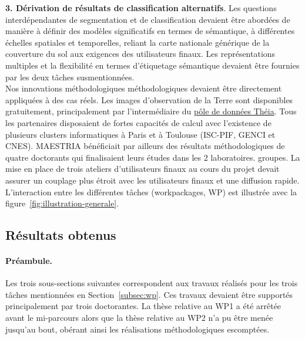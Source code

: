 \textbf{3. Dérivation de résultats de classification alternatifs}. Les questions interdépendantes de segmentation et de classification devaient être abordées de manière à définir des modèles significatifs en termes de sémantique, à différentes échelles spatiales et temporelles, reliant la carte nationale générique de la couverture du sol aux exigences des utilisateurs finaux. Les représentations multiples et la flexibilité en termes d'étiquetage sémantique devaient être fournies par les deux tâches susmentionnées.\\

Nos innovations méthodologiques méthodologiques devaient être directement appliquées à des cas réels. Les images d'observation de la Terre sont disponibles gratuitement, principalement par l'intermédiaire du \href{https://www.theia-land.fr/pole-theia-2/}{pôle de données Théia}. Tous les partenaires disposaient de fortes capacités
de calcul avec l'existence de plusieurs clusters informatiques à Paris et à Toulouse (ISC-PIF, GENCI et CNES). MAESTRIA bénéficiait par ailleurs des résultats méthodologiques de quatre doctorants qui finalisaient leurs études dans les 2 laboratoires. groupes. La mise en place de trois ateliers d'utilisateurs finaux au cours du projet devait assurer un couplage plus étroit avec les utilisateurs finaux et une diffusion rapide.\\

L'interaction entre les différentes tâches (workpackages, WP) est illustrée avec la figure~\ref{fig:illustration-generale}.


\subsection{Résultats obtenus}


\paragraph{Préambule.}
Les trois sous-sections suivantes correspondent aux travaux réalisés pour les trois tâches mentionnées en Section~\ref{subsec:wp}. Ces travaux devaient être supportés principalement par trois doctorant\textperiodcentered e\textperiodcentered s. La thèse relative au WP1 a été arrêtée avant le mi-parcours alors que la thèse relative au WP2 n'a pu être menée jusqu'au bout, obérant ainsi les réalisations méthodologiques escomptées.


